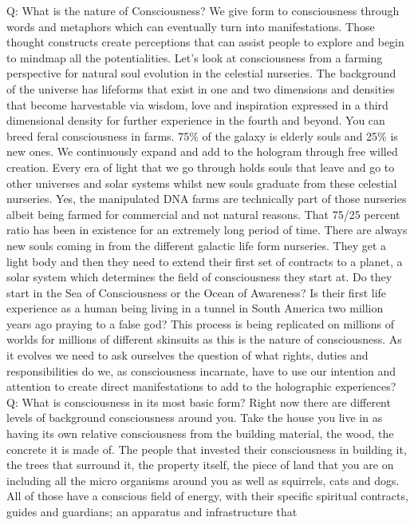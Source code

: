 Q: What is the nature of Consciousness? We give form to consciousness
through words and metaphors which can eventually turn into
manifestations. Those thought constructs create perceptions that can
assist people to explore and begin to mindmap all the potentialities.
Let's look at consciousness from a farming perspective for natural soul
evolution in the celestial nurseries. The background of the universe has
lifeforms that exist in one and two dimensions and densities that become
harvestable via wisdom, love and inspiration expressed in a third
dimensional density for further experience in the fourth and beyond. You
can breed feral consciousness in farms. 75\% of the galaxy is elderly
souls and 25\% is new ones. We continuously expand and add to the
hologram through free willed creation. Every era of light that we go
through holds souls that leave and go to other universes and solar
systems whilst new souls graduate from these celestial nurseries. Yes,
the manipulated DNA farms are technically part of those nurseries albeit
being farmed for commercial and not natural reasons. That 75/25 percent
ratio has been in existence for an extremely long period of time. There
are always new souls coming in from the different galactic life form
nurseries. They get a light body and then they need to extend their
first set of contracts to a planet, a solar system which determines the
field of consciousness they start at. Do they start in the Sea of
Consciousness or the Ocean of Awareness? Is their first life experience
as a human being living in a tunnel in South America two million years
ago praying to a false god? This process is being replicated on millions
of worlds for millions of different skinsuits as this is the nature of
consciousness. As it evolves we need to ask ourselves the question of
what rights, duties and responsibilities do we, as consciousness
incarnate, have to use our intention and attention to create direct
manifestations to add to the holographic experiences? Q: What is
consciousness in its most basic form? Right now there are different
levels of background consciousness around you. Take the house you live
in as having its own relative consciousness from the building material,
the wood, the concrete it is made of. The people that invested their
consciousness in building it, the trees that surround it, the property
itself, the piece of land that you are on including all the micro
organisms around you as well as squirrels, cats and dogs. All of those
have a conscious field of energy, with their specific spiritual
contracts, guides and guardians; an apparatus and infrastructure that
